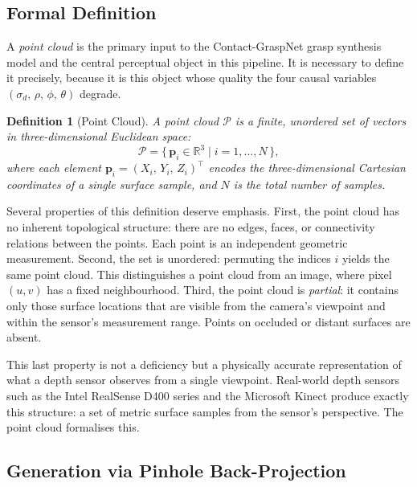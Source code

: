 \documentclass[11pt,a4paper]{report}
\newtheorem{definition}{Definition}[chapter]
\begin{document}
\subsection{Formal Definition}

A \emph{point cloud} is the primary input to the Contact-GraspNet grasp synthesis
model and the central perceptual object in this pipeline. It is necessary to define
it precisely, because it is this object whose quality the four causal variables
$(\sigma_d,\, \rho,\, \phi,\, \theta)$ degrade.

\begin{definition}[Point Cloud]
\label{def:pointcloud}
A point cloud $\mathcal{P}$ is a finite, unordered set of vectors in
three-dimensional Euclidean space:
\begin{equation}
  \mathcal{P} = \bigl\{\, \mathbf{p}_i \in \mathbb{R}^3 \;\big|\; i = 1, \ldots, N \,\bigr\},
  \label{eq:pointcloud_def}
\end{equation}
where each element $\mathbf{p}_i = (X_i,\, Y_i,\, Z_i)^\top$ encodes the
three-dimensional Cartesian coordinates of a single surface sample, and $N$ is
the total number of samples.
\end{definition}

Several properties of this definition deserve emphasis.  First, the point cloud
has no inherent topological structure: there are no edges, faces, or connectivity
relations between the points.  Each point is an independent geometric measurement.
Second, the set is unordered: permuting the indices $i$ yields the same point cloud.
This distinguishes a point cloud from an image, where pixel $(u,v)$ has a fixed
neighbourhood.  Third, the point cloud is \emph{partial}: it contains only those
surface locations that are visible from the camera's viewpoint and within the
sensor's measurement range.  Points on occluded or distant surfaces are absent.

This last property is not a deficiency but a physically accurate representation
of what a depth sensor observes from a single viewpoint.  Real-world depth sensors
such as the Intel RealSense D400 series and the Microsoft Kinect produce exactly
this structure: a set of metric surface samples from the sensor's perspective.
The point cloud formalises this.

\subsection{Generation via Pinhole Back-Projection}
\label{sec:backprojection}
\end{document}
